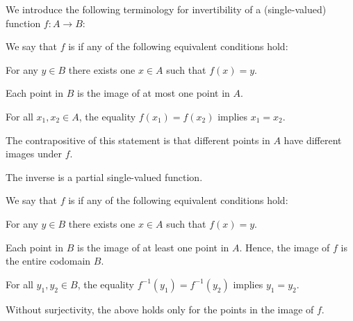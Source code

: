 \begin{definition}\label{def:function_invertibility}\mimprovised
  We introduce the following terminology for invertibility of a (single-valued) function \( f: A \to B \):
  \begin{thmenum}
    \begin{minipage}[t]{0.43\textwidth}
       We say that \( f \) is  if any of the following equivalent conditions hold:
      \begin{thmenum}
         For any \( y \in B \) there exists  one \( x \in A \) such that \( f(x) = y \).

        Each point in \( B \) is the image of at most one point in \( A \).
        \newline

         For all \( x_1, x_2 \in A \), the equality \( f(x_1) = f(x_2) \) implies \( x_1 = x_2 \).

        The contrapositive of this statement is that different points in \( A \) have different images under \( f \).

         The inverse is a partial single-valued function.
      \end{thmenum}
    \end{minipage}
    \hfill
    \begin{minipage}[t]{0.44\textwidth}
       We say that \( f \) is  if any of the following equivalent conditions hold:
      \newline
      \begin{thmenum}[leftmargin=0.9cm]
         For any \( y \in B \) there exists  one \( x \in A \) such that \( f(x) = y \).

        Each point in \( B \) is the image of at least one point in \( A \). Hence, the image of \( f \) is the entire codomain \( B \).

         For all \( y_1, y_2 \in B \), the equality \( f^{-1}(y_1) = f^{-1}(y_2) \) implies \( y_1 = y_2 \).

        Without surjectivity, the above holds only for the points in the image of \( f \).


\end{thmenum}
\end{minipage}
\end{thmenum}
\end{definition}
